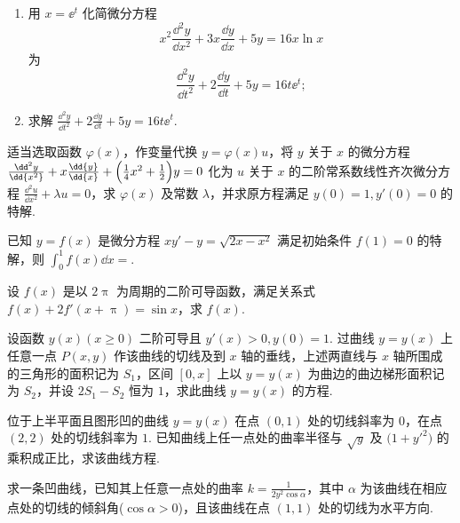 	\begin{ti}
		\begin{enumerate}
			\item 用 $x = \ee^{t}$ 化简微分方程
			\[
				x^{2} \frac{\dd^{2}y}{\dd{x^{2}}} + 3x \frac{\dd{y}}{\dd{x}} + 5y = 16x \ln x
			\]
			为
			\[
				\frac{\dd^{2}y}{\dd{t^{2}}} + 2\frac{\dd{y}}{\dd{t}} + 5y = 16t \ee^{t};
			\]
			\item 求解 $\frac{\dd^{2}y}{\dd{t^{2}}} + 2\frac{\dd{y}}{\dd{t}} + 5y = 16t \ee^{t}$.
		\end{enumerate}
	\end{ti}

	\begin{ti}
		适当选取函数 $\varphi(x)$，作变量代换 $y = \varphi(x) u$，将 $y$ 关于 $x$ 的微分方程 $\frac{\dd^{2}y}{\dd{x^{2}}} + x \frac{\dd{y}}{\dd{x}} + \Bigl( \frac{1}{4}x^{2} + \frac{1}{2} \Bigr)y = 0$ 化为 $u$ 关于 $x$ 的二阶常系数线性齐次微分方程 $\frac{\dd^{2}u}{\dd{x^{2}}} + \lambda u = 0$，求 $\varphi(x)$ 及常数 $\lambda$，并求原方程满足 $y(0) = 1,y'(0) = 0$ 的特解.
	\end{ti}

	\begin{ti}
		已知 $y = f(x)$ 是微分方程 $xy' - y = \sqrt{2x - x^{2}}$ 满足初始条件 $f(1) = 0$ 的特解，则 $\int_{0}^{1} f(x) \dd{x} = $\htwo.
	\end{ti}

	\begin{ti}
		设 $f(x)$ 是以 $2\uppi$ 为周期的二阶可导函数，满足关系式 $f(x) + 2f'(x + \uppi) = \sin x$，求 $f(x)$.
	\end{ti}

	\begin{ti}
		设函数 $y(x) (x \geq 0)$ 二阶可导且 $y'(x) > 0, y(0) = 1$. 过曲线 $y = y(x)$ 上任意一点 $P(x,y)$ 作该曲线的切线及到 $x$ 轴的垂线，上述两直线与 $x$ 轴所围成的三角形的面积记为 $S_{1}$，区间 $[0,x]$ 上以 $y = y(x)$ 为曲边的曲边梯形面积记为 $S_{2}$，并设 $2S_{1} - S_{2}$ 恒为 $1$，求此曲线 $y = y(x)$ 的方程.
	\end{ti}

	\begin{ti}
		位于上半平面且图形凹的曲线 $y = y(x)$ 在点 $(0,1)$ 处的切线斜率为 $0$，在点 $(2,2)$ 处的切线斜率为 $1$. 已知曲线上任一点处的曲率半径与 $\sqrt{y}$ 及 $\bigl( 1 + y'^{2} \bigr)$ 的乘积成正比，求该曲线方程.
	\end{ti}

	\begin{ti}
		求一条凹曲线，已知其上任意一点处的曲率 $k = \frac{1}{2y^{2} \cos \alpha}$，其中 $\alpha$ 为该曲线在相应点处的切线的倾斜角($\cos\alpha > 0$)，且该曲线在点 $(1,1)$ 处的切线为水平方向.
	\end{ti}

